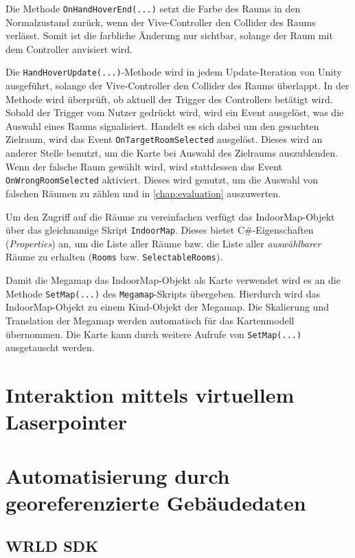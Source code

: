 Die Methode \lstinline|OnHandHoverEnd(...)| setzt die Farbe des Raums in den Normalzustand zurück, wenn der Vive-Controller den Collider des Raums verlässt.
Somit ist die farbliche Änderung nur sichtbar, solange der Raum mit dem Controller anvisiert wird.

Die \lstinline|HandHoverUpdate(...)|-Methode wird in jedem Update-Iteration von Unity ausgeführt, solange der Vive-Controller den Collider des Raums überlappt.
In der Methode wird überprüft, ob aktuell der Trigger des Controllers betätigt wird.
Sobald der Trigger vom Nutzer gedrückt wird, wird ein Event ausgelöst, was die Auswahl eines Raums signalisiert.
Handelt es sich dabei um den gesuchten Zielraum, wird das Event \lstinline|OnTargetRoomSelected| ausgelöst.
Dieses wird an anderer Stelle benutzt, um die Karte bei Auswahl des Zielraums auszublenden.
Wenn der falsche Raum gewählt wird, wird stattdessen das Event \lstinline|OnWrongRoomSelected| aktiviert.
Dieses wird genutzt, um die Auswahl von falschen Räumen zu zählen und in \autoref{chap:evaluation} auszuwerten. 

Um den Zugriff auf die Räume zu vereinfachen verfügt das IndoorMap-Objekt über das gleichnamige Skript \lstinline|IndoorMap|.
Dieses bietet C\#-Eigenschaften (\emph{Properties}) an, um die Liste aller Räume bzw. die Liste aller \emph{auswählbarer} Räume zu erhalten (\lstinline|Rooms| bzw. \lstinline|SelectableRooms|).

Damit die Megamap das IndoorMap-Objekt als Karte verwendet wird es an die Methode \lstinline|SetMap(...)| des \lstinline|Megamap|-Skripts übergeben.
Hierdurch wird das IndoorMap-Objekt zu einem Kind-Objekt der Megamap.
Die Skalierung und Translation der Megamap werden automatisch für das Kartenmodell übernommen.
Die Karte kann durch weitere Aufrufe von \lstinline|SetMap(...)| ausgetauscht werden.

\section{Interaktion mittels virtuellem Laserpointer}


\section{Automatisierung durch georeferenzierte Gebäudedaten}
\label{sec:building_data_automation}

\subsection{WRLD SDK}


